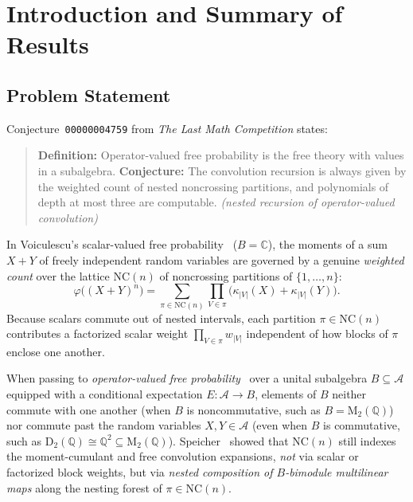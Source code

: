 \documentclass[11pt,a4paper]{article}
\theoremstyle{definition}
\newcommand{\NC}{\mathrm{NC}}
\newcommand{\Mat}{\mathrm{M}}
\newcommand{\Diag}{\mathrm{D}}
\begin{document}
\section{Introduction and Summary of Results}

\subsection{Problem Statement}
Conjecture~\texttt{00000004759} from \emph{The Last Math Competition} states:
\begin{quote}
\textbf{Definition:} Operator-valued free probability is the free theory with values in a subalgebra. \textbf{Conjecture:} The convolution recursion is always given by the weighted count of nested noncrossing partitions, and polynomials of depth at most three are computable. \emph{(nested recursion of operator-valued convolution)}
\end{quote}

In Voiculescu's scalar-valued free probability~\cite{Voiculescu1985,NicaSpeicher2006} ($B = \mathbb{C}$), the moments of a sum $X + Y$ of freely independent random variables are governed by a genuine \emph{weighted count} over the lattice $\NC(n)$ of noncrossing partitions of $\{1, \dots, n\}$:
\begin{equation}\label{eq:scalar-conv}
\varphi\bigl((X + Y)^n\bigr) = \sum_{\pi \in \NC(n)} \prod_{V \in \pi} \bigl(\kappa_{|V|}(X) + \kappa_{|V|}(Y)\bigr).
\end{equation}
Because scalars commute out of nested intervals, each partition $\pi \in \NC(n)$ contributes a factorized scalar weight $\prod_{V \in \pi} w_{|V|}$ independent of how blocks of $\pi$ enclose one another.

When passing to \emph{operator-valued free probability}~\cite{Voiculescu1995,Speicher1998} over a unital subalgebra $B \subseteq \mathcal{A}$ equipped with a conditional expectation $E \colon \mathcal{A} \to B$, elements of $B$ neither commute with one another (when $B$ is noncommutative, such as $B = \Mat_2(\mathbb{Q})$) nor commute past the random variables $X, Y \in \mathcal{A}$ (even when $B$ is commutative, such as $\Diag_2(\mathbb{Q}) \cong \mathbb{Q}^2 \subseteq \Mat_2(\mathbb{Q})$). Speicher~\cite{Speicher1998} showed that $\NC(n)$ still indexes the moment-cumulant and free convolution expansions, \emph{not} via scalar or factorized block weights, but via \emph{nested composition of $B$-bimodule multilinear maps} along the nesting forest of $\pi \in \NC(n)$.
\end{document}
